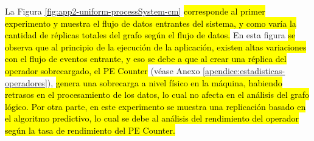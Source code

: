 %
%
%
%
%


La Figura \ref{fig:app2-uniform-processSystem-cm} \hl{corresponde al primer experimento y muestra el flujo de datos entrantes del sistema, y como varía la cantidad de réplicas totales del grafo según el flujo de datos.} En esta figura \hl{se observa que al principio de la ejecución de la aplicación, existen altas variaciones con el flujo de eventos entrante, y eso se debe a que al crear una réplica del operador sobrecargado, el PE Counter} (véase Anexo \ref{apendice:estadisticas-operadores}), \hl{genera una sobrecarga a nivel físico en la máquina, habiendo retrasos en el procesamiento de los datos, lo cual no afecta en el análisis del grafo lógico. Por otra parte, en este experimento se muestra una replicación basado en el algoritmo predictivo, lo cual se debe al análisis del rendimiento del operador según la tasa de rendimiento del PE Counter.}

